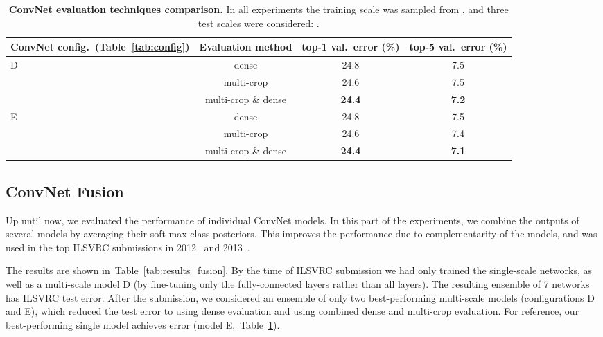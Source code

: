\documentclass{article} \usepackage{iclr2015,times}
\newcommand{\tblref}[1]{Table~\ref{#1}}
\begin{document}
\begin{table}[htb]
\small
\centering
\caption{\textbf{ConvNet evaluation techniques comparison.}
In all experiments the training scale  was sampled from , and three test scales  were considered: .
}
\begin{tabular}{|l|c|c|c|} \hline
ConvNet config.\ (\tblref{tab:config}) & Evaluation method & top-1 val.\ error (\%) & top-5 val.\ error (\%) \\ \hline
\multirow{3}{*}{D} & dense & 24.8  & 7.5  \\ \cline{2-4}
& multi-crop & 24.6 & 7.5  \\ \cline{2-4}
& multi-crop \& dense & \textbf{24.4}  & \textbf{7.2}  \\ \hline 
\multirow{3}{*}{E} & dense & 24.8  & 7.5  \\ \cline{2-4}
& multi-crop & 24.6 & 7.4  \\ \cline{2-4}
& multi-crop \& dense & \textbf{24.4}  & \textbf{7.1}  \\ \hline 
\end{tabular}
\label{tab:results_multi_crop}
\end{table}


\subsection{ConvNet Fusion}
\label{sec:fusion}
Up until now, we evaluated the performance of individual ConvNet models.
In this part of the experiments, we combine the outputs of several models by averaging their soft-max class posteriors.
This improves the performance due to complementarity of the models, and was used in the top ILSVRC submissions in 2012~\citep{Krizhevsky12} and 2013~\citep{Zeiler13,Sermanet14}.

The results are shown in~\tblref{tab:results_fusion}.
By the time of ILSVRC submission we had only trained the single-scale networks, as well as a multi-scale model D (by fine-tuning only the fully-connected layers rather than all layers). The resulting ensemble of 7 networks has  ILSVRC test error.
After the submission, we considered an ensemble of only two best-performing multi-scale models (configurations D and E), which reduced the test error to 
 using dense evaluation and  using combined dense and multi-crop evaluation.
For reference, our best-performing single model achieves  error (model E,~\tblref{tab:results_multi_crop}).
\end{document}
